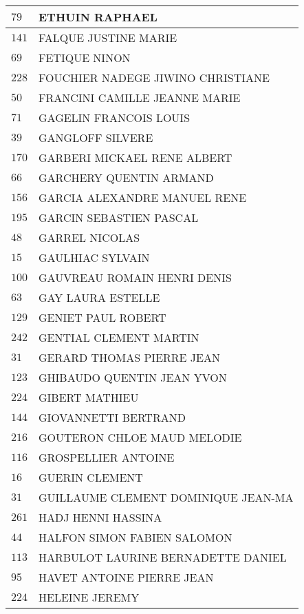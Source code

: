 \begin{xltabular}{\linewidth}{|l|X|}
    \hline
    $79$ & ETHUIN RAPHAEL \\
    \hline
    $141$ & FALQUE JUSTINE MARIE \\
    \hline
    $69$ & FETIQUE NINON \\
    \hline
    $228$ & FOUCHIER NADEGE JIWINO CHRISTIANE \\
    \hline
    $50$ & FRANCINI CAMILLE JEANNE MARIE \\
    \hline
    $71$ & GAGELIN FRANCOIS LOUIS \\
    \hline
    $39$ & GANGLOFF SILVERE \\
    \hline
    $170$ & GARBERI MICKAEL RENE ALBERT \\
    \hline
    $66$ & GARCHERY QUENTIN ARMAND \\
    \hline
    $156$ & GARCIA ALEXANDRE MANUEL RENE \\
    \hline
    $195$ & GARCIN SEBASTIEN PASCAL \\
    \hline
    $48$ & GARREL NICOLAS \\
    \hline
    $15$ & GAULHIAC SYLVAIN \\
    \hline
    $100$ & GAUVREAU ROMAIN HENRI DENIS \\
    \hline
    $63$ & GAY LAURA ESTELLE \\
    \hline
    $129$ & GENIET PAUL ROBERT \\
    \hline
    $242$ & GENTIAL CLEMENT MARTIN \\
    \hline
    $31$ & GERARD THOMAS PIERRE JEAN \\
    \hline
    $123$ & GHIBAUDO QUENTIN JEAN YVON \\
    \hline
    $224$ & GIBERT MATHIEU \\
    \hline
    $144$ & GIOVANNETTI BERTRAND \\
    \hline
    $216$ & GOUTERON CHLOE MAUD MELODIE \\
    \hline
    $116$ & GROSPELLIER ANTOINE \\
    \hline
    $16$ & GUERIN CLEMENT \\
    \hline
    $31$ & GUILLAUME CLEMENT DOMINIQUE JEAN-MA \\
    \hline
    $261$ & HADJ HENNI HASSINA \\
    \hline
    $44$ & HALFON SIMON FABIEN SALOMON \\
    \hline
    $113$ & HARBULOT LAURINE BERNADETTE DANIEL \\
    \hline
    $95$ & HAVET ANTOINE PIERRE JEAN \\
    \hline
    $224$ & HELEINE JEREMY \\

\end{xltabular}
